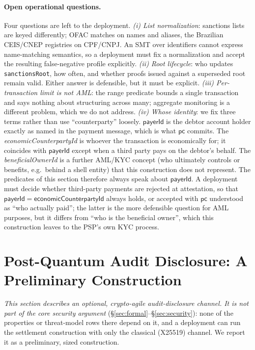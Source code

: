 \documentclass[11pt]{article}
\newcommand{\code}[1]{\texttt{#1}}
\begin{document}
\paragraph{Open operational questions.}
Four questions are left to the deployment. \emph{(i) List normalization}:
sanctions lists are keyed differently; OFAC matches on names and aliases, the
Brazilian CEIS/CNEP registries on CPF/CNPJ. An SMT over identifiers cannot
express name-matching semantics, so a deployment must fix a normalization and
accept the resulting false-negative profile explicitly. \emph{(ii) Root
lifecycle}: who updates \code{sanctionsRoot}, how often, and whether proofs
issued against a superseded root remain valid. Either answer is defensible, but
it must be explicit. \emph{(iii) Per-transaction limit is not AML}: the range
predicate bounds a single transaction and says nothing about structuring across
many; aggregate monitoring is a different problem, which we do not address.
\emph{(iv) Whose identity}: we fix three terms rather than use ``counterparty''
loosely. $\mathsf{payerId}$ is the debtor account holder exactly as named in the
payment message, which is what $\mathsf{pc}$ commits. The
\emph{economicCounterpartyId} is whoever the transaction is economically for; it
coincides with $\mathsf{payerId}$ except when a third party pays on the debtor's
behalf. The \emph{beneficialOwnerId} is a further AML/KYC concept (who
ultimately controls or benefits, e.g.\ behind a shell entity) that this
construction does not represent. The predicates of this section therefore
always speak about $\mathsf{payerId}$. A deployment must decide whether
third-party payments are rejected at attestation, so that
$\mathsf{payerId}=\mathsf{economicCounterpartyId}$ always holds, or accepted with
$\mathsf{pc}$ understood as ``who actually paid''; the latter is the more
defensible question for AML purposes, but it differs from ``who is the
beneficial owner'', which this construction leaves to the PSP's own KYC process.

\section{Post-Quantum Audit Disclosure: A Preliminary Construction}
\label{sec:pq}

\noindent\emph{This section describes an optional, crypto-agile audit-disclosure
channel. It is not part of the core security argument}
(\S\ref{sec:formal}--\S\ref{sec:security}): none of the properties or
threat-model rows there depend on it, and a deployment can run the settlement
construction with only the classical (X25519) channel. We report it as a
preliminary, sized construction.
\end{document}

